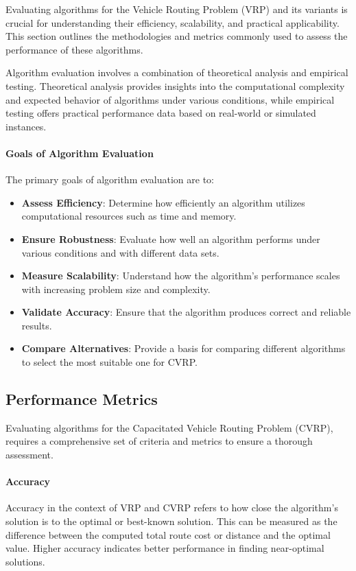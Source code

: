 \documentclass{article}
\begin{document}
    Evaluating algorithms for the Vehicle Routing Problem (VRP) and its variants is crucial for understanding their efficiency, scalability, and practical applicability. This section outlines the methodologies and metrics commonly used to assess the performance of these algorithms.

    Algorithm evaluation involves a combination of theoretical analysis and empirical testing.
    Theoretical analysis provides insights into the computational complexity and expected behavior of algorithms under various conditions, while empirical testing offers practical performance data based on real-world or simulated instances.

    \paragraph{Goals of Algorithm Evaluation}
    The primary goals of algorithm evaluation are to: \cite{staegemann2024}
    \begin{itemize}
        \item \textbf{Assess Efficiency}: Determine how efficiently an algorithm utilizes computational resources such as time and memory.
        \item \textbf{Ensure Robustness}: Evaluate how well an algorithm performs under various conditions and with different data sets.
        \item \textbf{Measure Scalability}: Understand how the algorithm's performance scales with increasing problem size and complexity.
        \item \textbf{Validate Accuracy}: Ensure that the algorithm produces correct and reliable results.
        \item \textbf{Compare Alternatives}: Provide a basis for comparing different algorithms to select the most suitable one for CVRP.
    \end{itemize}

    \subsection{Performance Metrics}
    \label{subsubsec:performance_metrics}
    Evaluating algorithms for the Capacitated Vehicle Routing Problem (CVRP), requires a comprehensive set of criteria and metrics to ensure a thorough assessment.

    \paragraph{Accuracy} Accuracy in the context of VRP and CVRP refers to how close the algorithm’s solution is to the optimal or best-known solution. This can be measured as the difference between the computed total route cost or distance and the optimal value. Higher accuracy indicates better performance in finding near-optimal solutions.
\end{document}
